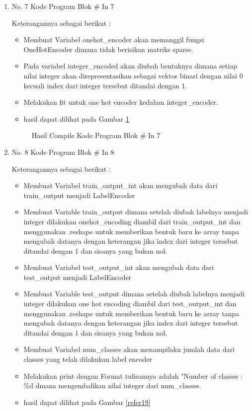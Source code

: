 \begin{enumerate}
\item No. 7 Kode Program Blok \# In 7
\par 
Keterangannya sebagai berikut :
\begin{itemize}
\item Membuat Variabel onehot\_encoder akan memanggil fungsi OneHotEncoder dimana tidak berisikan matriks sparse.
\item Pada variabel integer\_encoded akan diubah bentuknya dimana setiap nilai integer akan direpresentasikan sebagai vektor binari dengan nilai 0 kecuali index dari integer tersebut ditandai dengan 1.
\item Melakukan fit untuk one hot encoder kedalam integer\_encoder.
\item hasil dapat dilihat pada Gambar \ref{refer18}
\end{itemize}

\begin{figure}[!htbp]
      \caption{Hasil Compile Kode Program Blok \# In 7}
      \label{refer18}
\end{figure}

\item No. 8 Kode Program Blok \# In 8
\par 
Keterangannya sebagai berikut :
\begin{itemize}
\item Membuat Variabel train\_output\_int  akan mengubah data dari train\_output menjadi LabelEncoder
\item Membuat Variable train\_output dimana setelah diubah labelnya menjadi integer dilakukan onehot\_encoding diambil dari train\_output\_int dan menggunakan .reshape untuk memberikan bentuk baru ke array tanpa mengubah datanya dengan keterangan jika index dari integer tersebut ditandai dengan 1 dan sisanya yang bukan nol.
\item Membuat Variabel test\_output\_int  akan mengubah data dari test\_output menjadi LabelEncoder
\item Membuat Variable test\_output dimana setelah diubah labelnya menjadi integer dilakukan one hot encoding diambil dari test\_output\_int dan menggunakan .reshape untuk memberikan bentuk baru ke array tanpa mengubah datanya dengan keterangan jika index dari integer tersebut ditandai dengan 1 dan sisanya yang bukan nol.
\item Membuat Variabel num\_classes akan menampilakn jumlah data dari classes yang telah dilakukan label encoder
\item Melakukan print dengan Format tulisannya adalah "Number of classes : \%d dmana mengembalikan nilai integer dari num\_classes.
\item hasil dapat dilihat pada Gambar \ref{refer19}
\end{itemize}


\end{enumerate}
